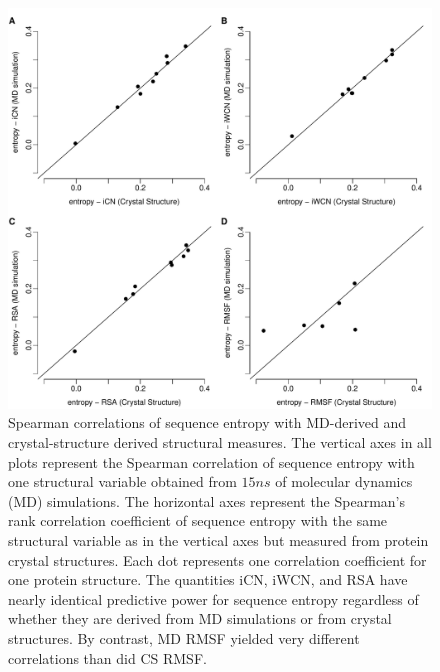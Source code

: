 \documentclass[smallextended]{svjour3}
\begin{document}
\begin{figure}[tbh]
\begin{center}
    \includegraphics[width=6.5in]{cor_cr_md.pdf}
\end{center}
\caption{Spearman correlations of sequence entropy with MD-derived and crystal-structure derived structural measures. The vertical axes in all plots represent the Spearman correlation of sequence entropy with one structural variable obtained from $15ns$ of molecular dynamics (MD) simulations. The horizontal axes represent the Spearman's rank correlation coefficient of sequence entropy with the same structural variable as in the vertical axes but measured from protein crystal structures. Each dot represents one correlation coefficient for one protein structure. The quantities iCN, iWCN, and RSA have nearly identical predictive power for sequence entropy regardless of whether they are derived from MD simulations or from crystal structures. By contrast, MD RMSF yielded very different correlations than did CS RMSF.}
\label{fig:cor_cr_md}
\end{figure}
\end{document}
